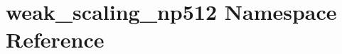 \hypertarget{namespaceweak__scaling__np512}{}\section{weak\+\_\+scaling\+\_\+np512 Namespace Reference}
\label{namespaceweak__scaling__np512}
